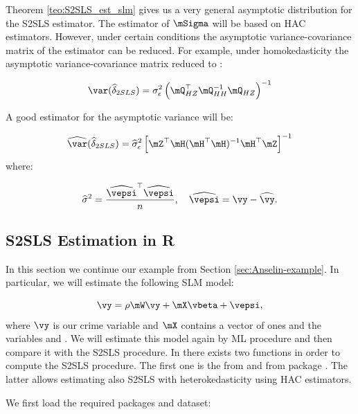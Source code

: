 \documentclass[english,12pt]{book}\usepackage[]{graphicx}\usepackage[]{xcolor}
\begin{document}
Theorem \ref{teo:S2SLS_est_slm} gives us a very general asymptotic distribution for the S2SLS estimator. The estimator of $\mSigma$ will be based on HAC estimators. However, under certain conditions the asymptotic variance-covariance matrix of the estimator can be reduced. For example, under homokedasticity the asymptotic variance-covariance matrix reduced to :

\begin{equation}
\var(\widehat{\delta}_{2SLS}) = \sigma^2_{\epsilon}\left(\mQ_{HZ}^\top\mQ_{HH}^{-1}\mQ_{HZ}\right)^{-1}
\end{equation}

A good estimator for the asymptotic variance will be:

\begin{equation}
\widehat{\var}(\widehat{\delta}_{2SLS}) = \widehat{\sigma}^2_{\epsilon}\left[\mZ^\top \mH (\mH^\top\mH)^{-1}\mH^\top\mZ\right]^{-1}
\end{equation}
%
where:

\begin{equation}
  \widehat{\sigma}^2 = \frac{\widehat{\vepsi}^\top\widehat{\vepsi}}{n},\quad \widehat{\vepsi} = \vy - \widehat{\vy}.
\end{equation}

\subsection{S2SLS Estimation in R}

In this section we continue our example from Section \ref{sec:Anselin-example}. In particular, we will estimate the following SLM model:

\begin{equation*}
\vy = \rho\mW\vy + \mX\vbeta + \vepsi,
\end{equation*}
%
where $\vy$ is our crime variable and $\mX$ contains a vector of ones and the variables  and . We will estimate this model again by ML procedure and then compare it with the S2SLS procedure. In  there exists two functions in order to compute the  S2SLS procedure. The first one is the  from  and  from  package \citep{sphetp}. The latter allows estimating also S2SLS with heterokedasticity using HAC estimators. 

We first load the required packages and dataset:
\end{document}
